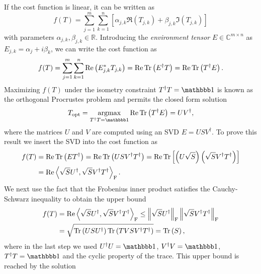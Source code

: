 If the cost function is linear, it can be written as
\begin{equation}
	f(T) = \sum_{j=1}^{m}\sum_{k=1}^{n}\left[\alpha_{j,k}\Re\left(T_{j,k}\right) + \beta_{j,k} \Im\left(T_{j,k}\right)\right]
\end{equation}
with parameters $\alpha_{j,k}, \beta_{j,k} \in \mathbb{R}$. Introducing the \textit{environment tensor} $E\in\mathbb{C}^{m\times n}$ as $E_{j,k} = \alpha_j + i \beta_k$, we can write the cost function as
\begin{equation}
	f(T) = \sum_{j=1}^{m}\sum_{k=1}^{n} \operatorname{Re}\left(E_{j,k}^*T_{j,k}\right) = \operatorname{Re}\operatorname{Tr}\left(E^\dagger T\right) = \operatorname{Re}\operatorname{Tr}\left(T^\dagger E\right).
\end{equation}
Maximizing $f(T)$ under the isometry constraint $T^\dagger T = \id$ is known as the orthogonal Procrustes problem and permits the closed form solution
\begin{equation}
	\label{eq:orthogonal_procrustes_problem_closed_form_solution}
	T_\text{opt} = \underset{T^\dagger T = \id}{\argmax} \Re\Tr\left(T^\dagger E\right) = UV^\dagger,
\end{equation}
where the matrices $U$ and $V$ are computed using an SVD $E = USV^\dagger$. To prove this result we insert the SVD into the cost function as
\begin{equation}
	\begin{split}
	f(T) &= \operatorname{Re}\operatorname{Tr}\left(ET^\dagger\right) = \operatorname{Re}\operatorname{Tr}\left(USV^\dagger T^\dagger\right) = \operatorname{Re}\operatorname{Tr}\left[\left(U\sqrt{S}\right)\left(\sqrt{S}V^\dagger T^\dagger\right)\right] \\
	&= \operatorname{Re}\left\langle\sqrt{S}U^\dagger,\sqrt{S}V^\dagger T^\dagger\right\rangle_\text{F}.
	\end{split}
\end{equation}
We next use the fact that the Frobenius inner product satisfies the Cauchy-Schwarz inequality to obtain the upper bound
\begin{equation}
	\begin{split}
		f(T) &= \operatorname{Re}\left\langle\sqrt{S}U^\dagger,\sqrt{S}V^\dagger T^\dagger\right\rangle_\text{F} \le \left\lVert\sqrt{S}U^\dagger\right\rVert_\text{F}\left\lVert\sqrt{S}V^\dagger T^\dagger\right\rVert_\text{F} \\
		&= \sqrt{\operatorname{Tr}\left(USU^\dagger\right)\operatorname{Tr}\left(TVSV^\dagger T^\dagger\right)} = \operatorname{Tr}\left(S\right),
	\end{split}
\end{equation}
where in the last step we used $U^\dagger U = \id$, $V^\dagger V = \id$, $T^\dagger T = \id$ and the cyclic property of the trace. This upper bound is reached by the solution

